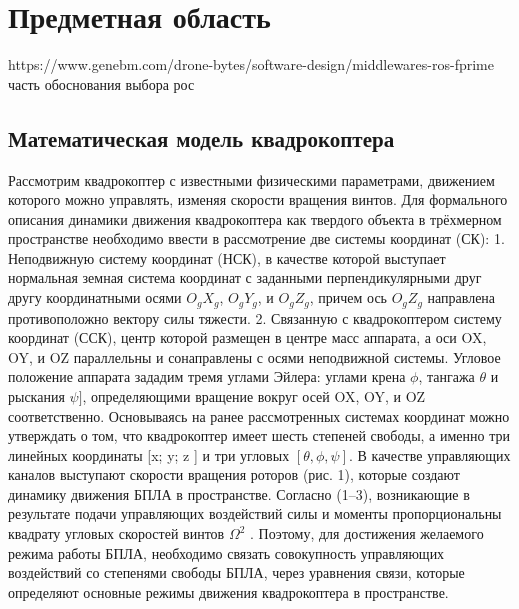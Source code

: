 
\section{Предметная область}

https://www.genebm.com/drone-bytes/software-design/middlewares-ros-fprime часть обоснования выбора рос

\subsection{Математическая модель квадрокоптера}
Рассмотрим квадрокоптер с известными физическими параметрами, движением которого можно управлять, изменяя скорости вращения винтов. Для формального описания динамики движения квадрокоптера как твердого объекта в трёхмерном пространстве необходимо ввести в рассмотрение две системы координат (СК):
1. Неподвижную систему координат (НСК), в качестве которой выступает нормальная земная система координат с заданными перпендикулярными друг другу координатными осями \(O_{g}X_{g}\), \(O_{g}Y_{g}\), и \(O_{g}Z_{g}\), причем ось \(O_{g}Z_{g}\) направлена противоположно вектору силы тяжести.
2. Связанную с квадрокоптером систему координат (ССК), центр которой размещен в центре масс аппарата, а оси OX, OY, и OZ параллельны и сонаправлены с осями неподвижной системы. Угловое положение аппарата зададим тремя углами Эйлера: углами крена \(\phi\), тангажа \(\theta\) и рыскания \(\psi]\), определяющими вращение вокруг осей OX, OY, и OZ соответственно. Основываясь на ранее рассмотренных системах координат можно утверждать о том, что квадрокоптер имеет шесть степеней свободы, а именно три линейных координаты [x; y; z ] и три угловых \([\theta, \phi, \psi]\). В качестве управляющих каналов выступают скорости вращения роторов (рис. 1), которые создают динамику движения БПЛА в пространстве. Согласно (1–3), возникающие в результате подачи управляющих воздействий силы и моменты пропорциональны квадрату угловых скоростей винтов \(\Omega^2\) . Поэтому, для достижения желаемого режима работы БПЛА, необходимо связать совокупность управляющих воздействий со степенями свободы БПЛА, через уравнения связи, которые определяют основные режимы движения квадрокоптера в пространстве.


